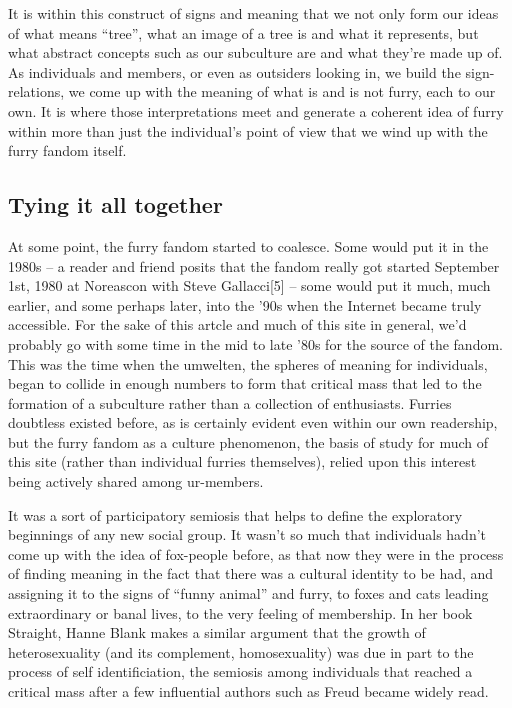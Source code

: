 It is within this construct of signs and meaning that we not only form our ideas of what means ``tree'', what an image of a tree is and what it represents, but what abstract concepts such as our subculture are and what they're made up of. As individuals and members, or even as outsiders looking in, we build the sign-relations, we come up with the meaning of what is and is not furry, each to our own. It is where those interpretations meet and generate a coherent idea of furry within more than just the individual's point of view that we wind up with the furry fandom itself.

\subsection*{Tying it all together}

At some point, the furry fandom started to coalesce. Some would put it in the 1980s -- a reader and friend posits that the fandom really got started September 1st, 1980 at Noreascon with Steve Gallacci[5] -- some would put it much, much earlier, and some perhaps later, into the '90s when the Internet became truly accessible. For the sake of this artcle and much of this site in general, we'd probably go with some time in the mid to late '80s for the source of the fandom. This was the time when the umwelten, the spheres of meaning for individuals, began to collide in enough numbers to form that critical mass that led to the formation of a subculture rather than a collection of enthusiasts. Furries doubtless existed before, as is certainly evident even within our own readership, but the furry fandom as a culture phenomenon, the basis of study for much of this site (rather than individual furries themselves), relied upon this interest being actively shared among ur-members.

It was a sort of participatory semiosis that helps to define the exploratory beginnings of any new social group. It wasn't so much that individuals hadn't come up with the idea of fox-people before, as that now they were in the process of finding meaning in the fact that there was a cultural identity to be had, and assigning it to the signs of ``funny animal'' and furry, to foxes and cats leading extraordinary or banal lives, to the very feeling of membership. In her book Straight, Hanne Blank makes a similar argument that the growth of heterosexuality (and its complement, homosexuality) was due in part to the process of self identificiation, the semiosis among individuals that reached a critical mass after a few influential authors such as Freud became widely read.

